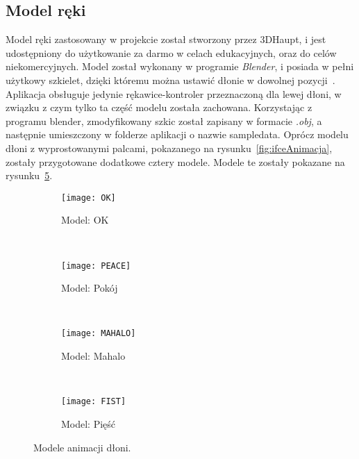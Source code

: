 	\subsection{Model ręki}
	\label{subsec:model}
	Model ręki zastosowany w projekcie został stworzony przez 3DHaupt, i jest udostępniony do użytkowanie za darmo w celach edukacyjnych, oraz do celów niekomercyjnych. Model został wykonany w programie \textit{Blender}, i posiada w pełni użytkowy szkielet, dzięki któremu można ustawić dłonie w dowolnej pozycji~\cite{hands}. Aplikacja obsługuje jedynie rękawice-kontroler przeznaczoną dla lewej dłoni, w związku z czym tylko ta część modelu została zachowana. Korzystając z programu blender, zmodyfikowany szkic został zapisany w formacie \textit{.obj}, a następnie umieszczony w folderze aplikacji o nazwie sampledata. Oprócz modelu dłoni z wyprostowanymi palcami, pokazanego na rysunku~\ref{fig:ifceAnimacja}, zostały przygotowane dodatkowe cztery modele. Modele te zostały pokazane na rysunku~\ref{fig:modele}.
\begin{figure}[h]
\centering
	\begin{subfigure}[b]{0.22\textwidth}
	\texttt{[image: OK]}
	\caption{Model: OK}
	\label{fig:modelOk}
	\end{subfigure}
	~
	\begin{subfigure}[b]{0.22\textwidth}
	\texttt{[image: PEACE]}
	\caption{Model: Pokój}
	\label{fig:modelPeace}
	\end{subfigure}
	~
	\begin{subfigure}[b]{0.22\textwidth}
	\texttt{[image: MAHALO]}
	\caption{Model: Mahalo}
	\label{fig:modelMahalo}
	\end{subfigure}
	~
	\begin{subfigure}[b]{0.22\textwidth}
	\texttt{[image: FIST]}
	\caption{Model: Pięść}
	\label{fig:modelFist}
	\end{subfigure}
\caption{Modele animacji dłoni.}
\label{fig:modele}
\end{figure}
